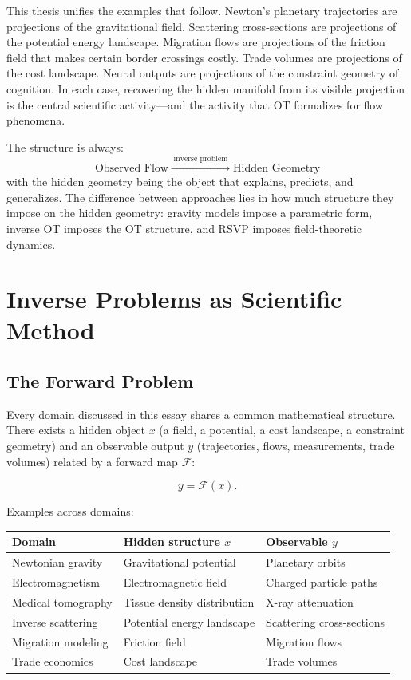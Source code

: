 \documentclass[12pt]{article}
\begin{document}
This thesis unifies the examples that follow. Newton's planetary trajectories are projections of the gravitational field. Scattering cross-sections are projections of the potential energy landscape. Migration flows are projections of the friction field that makes certain border crossings costly. Trade volumes are projections of the cost landscape. Neural outputs are projections of the constraint geometry of cognition. In each case, recovering the hidden manifold from its visible projection is the central scientific activity---and the activity that OT formalizes for flow phenomena.

The structure is always:
\[
\text{Observed Flow} \;\xrightarrow{\;\text{inverse problem}\;}\; \text{Hidden Geometry}
\]
with the hidden geometry being the object that explains, predicts, and generalizes. The difference between approaches lies in how much structure they impose on the hidden geometry: gravity models impose a parametric form, inverse OT imposes the OT structure, and RSVP imposes field-theoretic dynamics.

\section{Inverse Problems as Scientific Method}

\subsection{The Forward Problem}

Every domain discussed in this essay shares a common mathematical structure. There exists a hidden object $x$ (a field, a potential, a cost landscape, a constraint geometry) and an observable output $y$ (trajectories, flows, measurements, trade volumes) related by a forward map $\mathcal{F}$:

\begin{equation}
y = \mathcal{F}(x).
\label{eq:forward_generic}
\end{equation}

Examples across domains:

\begin{center}
\renewcommand{\arraystretch}{1.3}
\begin{tabular}{lll}
\toprule
\textbf{Domain} & \textbf{Hidden structure $x$} & \textbf{Observable $y$} \\
\midrule
Newtonian gravity & Gravitational potential & Planetary orbits \\
Electromagnetism & Electromagnetic field & Charged particle paths \\
Medical tomography & Tissue density distribution & X-ray attenuation \\
Inverse scattering & Potential energy landscape & Scattering cross-sections \\
Migration modeling & Friction field & Migration flows \\
Trade economics & Cost landscape & Trade volumes \\
\bottomrule
\end{tabular}
\end{center}
\end{document}
